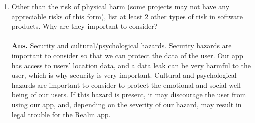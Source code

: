 \documentclass{article}
\begin{document}
\begin{enumerate}
    \item Other than the risk of physical harm (some projects may not have any appreciable risks of this form), list at least 2 other types of risk in software products. Why are they important to consider? \\ \\
    \hspace*{-0.97cm}\textbf{Ans.} Security and cultural/psychological hazards. Security hazards are important to consider so that we can protect the data of the user. Our app has access to users' location data, and a data leak can be very harmful to the user, which is why security is very important. Cultural and psychological hazards are important to consider to protect the emotional and social well-being of our users. If this hazard is present, it may discourage the user from using our app, and, depending on the severity of our hazard, may result in legal trouble for the Realm app.\\

\end{enumerate}
\end{document}
